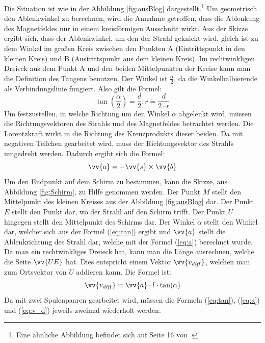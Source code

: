 Die Situation ist wie in der Abbildung \ref{fig:ausBlog} dargestellt.\footnote{Eine ähnliche Abbildung befindet sich auf Seite 16 von \cite{Gente1950}.}
Um geometrisch den Ablenkwinkel zu berechnen, wird die Annahme getroffen, dass die Ablenkung des Magnetfeldes nur in einem kreisförmigen Ausschnitt wirkt.
Aus der Skizze ergibt sich, dass der Ablenkwinkel, um den der Strahl geknickt wird, gleich ist zu dem Winkel im großen Kreis zwischen den Punkten A (Eintrittspunkt in den kleinen Kreis) und B (Austrittspunkt aus dem kleinen Kreis).
Im rechtwinkligen Dreieck aus dem Punkt A und den beiden Mittelpunkten der Kreise kann man die Definition des Tangens benutzen.
Der Winkel ist $\frac{\alpha}{2}$, da die Winkelhalbierende als Verbindungslinie fungiert.
Also gilt die Formel:
\begin{equation}
    \label{eq:tan}
    \tan \left(\frac{\alpha}{2}\right) = \frac{d}{2}:r = \frac{d}{2 \cdot r}
\end{equation}
Um festzustellen, in welche Richtung um den Winkel $\alpha$ abgelenkt wird, müssen die Richtungsvektoren des Strahls und des Magnetfeldes betrachtet werden.
Die Lorentzkraft wirkt in die Richtung des Kreuzprodukts dieser beiden.
Da mit negativen Teilchen gearbeitet wird, muss der Richtungsvektor des Strahls umgedreht werden. Dadurch ergibt sich die Formel: \begin{equation}
    \label{eq:a}
    \vv{a} = - \vv{s}\times \vv{b}
\end{equation}
Um den Endpunkt auf dem Schirm zu bestimmen, kann die Skizze, aus Abbildung \ref{fig:Schirm}, zu Hilfe genommen werden.
Der Punkt $M$ stellt den Mittelpunkt des kleinen Kreises aus der Abbildung \ref{fig:ausBlog} dar.
Der Punkt $E$ stellt den Punkt dar, wo der Strahl auf den Schirm trifft.
Der Punkt $U$ hingegen stellt den Mittelpunkt des Schirms dar.
Der Winkel $\alpha$ stellt den Winkel dar, welcher sich aus der Formel (\ref{eq:tan}) ergibt und $\vv{a}$ stellt die Ablenkrichtung des Strahl dar, welche mit der Formel (\ref{eq:a}) berechnet wurde.
Da man ein rechtwinkliges Dreieck hat, kann man die Länge ausrechnen, welche die Seite $\vv{UE}$ hat.
Dies entspricht einem Vektor $\vv{v_\mathit{diff}}$, welchen man zum Ortsvektor von $U$ addieren kann.
Die Formel ist:
\begin{equation}
    \label{eq:v_d}
    \vv{v_\mathit{diff}} =  \vv{a} \cdot l \cdot \tan(\alpha)
\end{equation}
Da mit zwei Spulenpaaren gearbeitet wird, müssen die Formeln (\ref{eq:tan}), (\ref{eq:a}) und (\ref{eq:v_d}) jeweils zweimal wiederholt werden.
